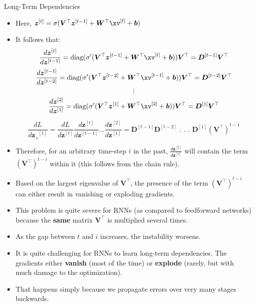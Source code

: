 \begin{vbframe}{Long-Term Dependencies}
  
  \begin{itemize}
    \item Here, $\bm{z}^{[t]} = \sigma(\bm{V}^\top \bm{z}^{[t-1]} + \bm{W}^\top \xv^{[t]} + \bm{b})$
    \item It follows that:
    $$ \frac{d \bm{z}^{[t]}}{d\bm{z}^{[t-1]}} = \text{diag}(\sigma' (\bm{V}^\top \bm{z}^{[t-1]} + \bm{W}^\top \xv^{[t]} + \bm{b})) \bm{V}^\top = \bm{D}^{[t-1]} \bm{V}^\top $$
    $$ \frac{d \bm{z}^{[t-1]}}{d\bm{z}^{[t-2]}} = \text{diag}(\sigma' (\bm{V}^\top \bm{z}^{[t-2]} + \bm{W}^\top \xv^{[t-1]} + \bm{b})) \bm{V}^\top= \bm{D}^{[t-2]} \bm{V}^\top $$
    $$ \vdots $$
    $$ \frac{d \bm{z}^{[2]}}{d\bm{z}^{[1]}} = \text{diag}(\sigma' (\bm{V}^\top \bm{z}^{[1]} + \bm{W}^\top \xv^{[2]} + \bm{b})) \bm{V}^\top = \bm{D}^{[1]} \bm{V}^\top $$
    
    $$ \frac{d L}{d \bm{z}¸^{[1]}} = \frac{d L}{d \bm{z}^{[t]}} \frac{d \bm{z}^{[t]}}{d \bm{z}^{[t-1]}} \dots \frac{d \bm{z}^{[2]}}{d \bm{z}^{[1]}} = \bm{D}^{[t-1]} \bm{D}^{[t-2]}   \text{ . . . } \bm{D}^{[1]} (\bm{V}^\top)^{t-1}$$
    \item Therefore, for an arbitrary time-step $i$ in the past, $\frac{d\bm{z}^{[t]}}{d\bm{z}^{[i]}}$ will contain the term $(\bm{V}^\top)^{t-i}$ within it (this follows from the chain rule).
    \item Based on the largest eigenvalue of $\bm{V}^\top$, the presence of the term $(\bm{V}^\top)^{t-i}$ can either result in vanishing or exploding gradients.
    \item This problem is quite severe for RNNs (as compared to feedforward networks) because the \textbf{same} matrix $\bm{V}^\top$ is multiplied several times. \href{https://tinyurl.com/vangrad}{}
    \item As the gap between $t$ and $i$ increases, the instability worsens.
    \item It is quite challenging for RNNs to learn long-term dependencies. The gradients either \textbf{vanish} (most of the time) or \textbf{explode} (rarely, but with much damage to the optimization).
    \item That happens simply because we propagate errors over very many stages backwards.
  \end{itemize}
  

\end{vbframe}
